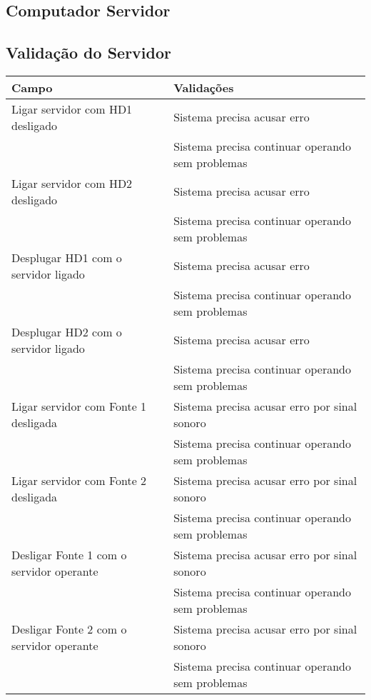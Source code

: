 \subsection{Computador Servidor}
\label{sec:alvo_servidor}

\subsection{Validação do Servidor}
\label{sec:validacao_servidor}

\begin{longtable}{p{}|p{}}

Campo & Validações \\ \hline

Ligar servidor com HD1 desligado & Sistema precisa acusar erro \\ \cline{2-2}  & Sistema precisa continuar operando sem problemas \\ \hline

Ligar servidor com HD2 desligado & Sistema precisa acusar erro \\ \cline{2-2}  & Sistema precisa continuar operando sem problemas \\ \hline

Desplugar HD1 com o servidor ligado & Sistema precisa acusar erro \\ \cline{2-2}  & Sistema precisa continuar operando sem problemas \\ \hline

Desplugar HD2 com o servidor ligado & Sistema precisa acusar erro \\ \cline{2-2}  & Sistema precisa continuar operando sem problemas \\ \hline

Ligar servidor com Fonte 1 desligada & Sistema precisa acusar erro por sinal sonoro \\ \cline{2-2}  & Sistema precisa continuar operando sem problemas \\ \hline

Ligar servidor com Fonte 2 desligada & Sistema precisa acusar erro por sinal sonoro \\ \cline{2-2}  & Sistema precisa continuar operando sem problemas \\ \hline

Desligar Fonte 1 com o servidor operante & Sistema precisa acusar erro por sinal sonoro \\ \cline{2-2}  & Sistema precisa continuar operando sem problemas \\ \hline

Desligar Fonte 2 com o servidor operante & Sistema precisa acusar erro por sinal sonoro \\ \cline{2-2}  & Sistema precisa continuar operando sem problemas \\ \hline

\end{longtable}
